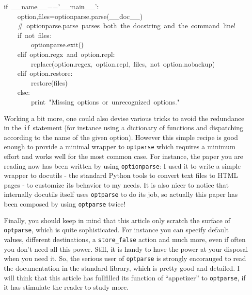 \documentclass[10pt,english]{article}
\begin{document}
\begin{ttfamily}
\begin{flushleft}
\mbox{if~{\_}{\_}name{\_}{\_}=='{\_}{\_}main{\_}{\_}':}\\
\mbox{~~~~option,files=optionparse.parse({\_}{\_}doc{\_}{\_})}\\
\mbox{~~~~{\#}~optionparse.parse~parses~both~the~docstring~and~the~command~line!}\\
\mbox{~~~~if~not~files:}\\
\mbox{~~~~~~~~optionparse.exit()}\\
\mbox{~~~~elif~option.regx~and~option.repl:}\\
\mbox{~~~~~~~~replace(option.regex,~option.repl,~files,~not~option.nobackup)}\\
\mbox{~~~~elif~option.restore:}\\
\mbox{~~~~~~~~restore(files)}\\
\mbox{~~~~else:}\\
\mbox{~~~~~~~~print~"Missing~options~or~unrecognized~options."}
\end{flushleft}\end{ttfamily}

Working a bit more, one could also devise various tricks to avoid
the redundance in the \texttt{if} statement (for instance using a
dictionary of functions and dispatching according to the name of
the given option). However this simple recipe is good enough to
provide a minimal wrapper to \texttt{optparse} which requires a minimum effort
and works well for the most common case. For instance, the paper you are 
reading now has been written by using \texttt{optionparse}: I used it to 
write a simple wrapper to docutils - the standard
Python tools to convert text files to HTML pages - to customize 
its behavior to my needs. It is also nicer to notice that internally
docutils itself uses \texttt{optparse} to do its job, so actually this
paper has been composed by using \texttt{optparse} twice!

Finally, you should keep in mind that this article only scratch the
surface of \texttt{optparse}, which is quite sophisticated. 
For instance you can specify default values, different destinations, 
a \texttt{store{\_}false} action and much more, even if often you don't need 
all this power. Still, it is handy to have the power at your disposal when 
you need it.  So, the serious user of \texttt{optparse} is strongly 
encorauged to read the documentation in the standard library, which 
is pretty good and detailed. I will think that this article has fullfilled
its function of ``appetizer'' to \texttt{optparse}, if it has stimulate 
the reader to study more.
\end{document}
